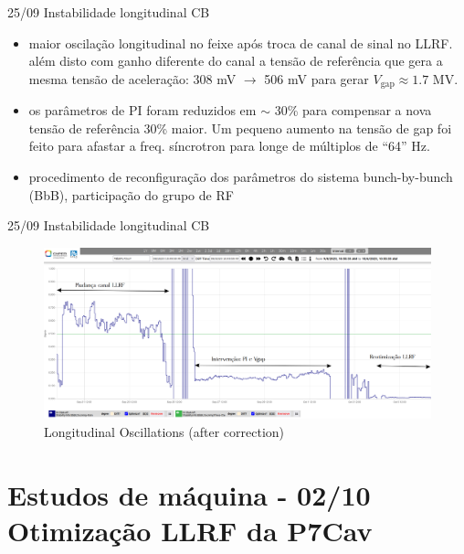 \documentclass{beamer}					%
\begin{document}
\begin{frame}{25/09 Instabilidade longitudinal CB}
    \begin{itemize}
        \item maior oscilação longitudinal no feixe após troca de canal de sinal no LLRF. além disto com ganho diferente do canal a tensão de referência que gera a mesma tensão de aceleração: 308 mV $\rightarrow$ 506 mV para gerar $V_\mathrm{gap} \approx 1.7$ MV.
        \item os parâmetros de PI foram reduzidos em $\sim$ 30\% para compensar a nova tensão de referência 30\% maior. Um pequeno aumento na tensão de gap foi feito para afastar a freq. síncrotron para longe de múltiplos de ``64'' Hz.
        \item procedimento de reconfiguração dos parâmetros do sistema bunch-by-bunch (BbB), participação do grupo de RF
	\end{itemize}
\end{frame}



\begin{frame}{25/09 Instabilidade longitudinal CB}

    \begin{figure}[H]
		\centering
        \includegraphics[width=.9\textwidth]{figures/long-osc-after-correction.png}
        \caption{Longitudinal Oscillations (after correction)}
        \label{fig:figure1}
    \end{figure}
    
\end{frame}

\section{Estudos de máquina - 02/10 Otimização LLRF da P7Cav}
\end{document}
